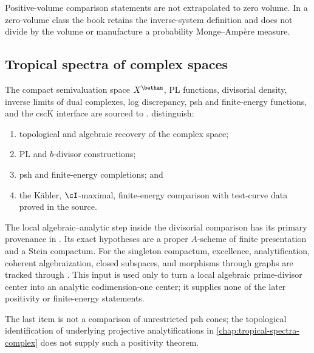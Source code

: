 Positive-volume comparison statements are not extrapolated to zero volume.
In a zero-volume class the book retains the inverse-system definition and
does not divide by the volume or manufacture a probability Monge--Ampère
measure.

\subsection{Tropical spectra of complex spaces}
\label{sec:appL-complex-spectra}

The compact semivaluation space \(X^{\bethan}\), PL functions, divisorial
density, inverse limits of dual complexes, log discrepancy, psh and
finite-energy functions, and the cscK interface are sourced to
\cite{MP24}.  
distinguish:

\begin{enumerate}
\item topological and algebraic recovery of the complex space;
\item PL and \(b\)-divisor constructions;
\item psh and finite-energy completions; and
\item the Kähler, \(\cI\)-maximal, finite-energy comparison with test-curve
      data proved in the source.
\end{enumerate}

The local algebraic--analytic step inside the divisorial comparison has its
primary provenance in \cite[Aussage~2.8]{Bingener76Stein}.  Its exact
hypotheses are a proper \(A\)-scheme of finite presentation and a Stein
compactum.  For the singleton compactum, excellence, analytification,
coherent algebraization, closed subspaces, and morphisms through graphs are
tracked through \cite[Corollary~4.4.5, Theorems~5.3.1 and 5.4.4, and
Corollaries~5.4.12--5.4.14]{XiaStein26}.  This input is used only to turn a
local algebraic prime-divisor center into an analytic codimension-one center;
it supplies none of the later positivity or finite-energy statements.

The last item is not a comparison of unrestricted psh cones; the
topological identification of underlying projective analytifications in
\cref{chap:tropical-spectra-complex} does not supply such a positivity theorem.

